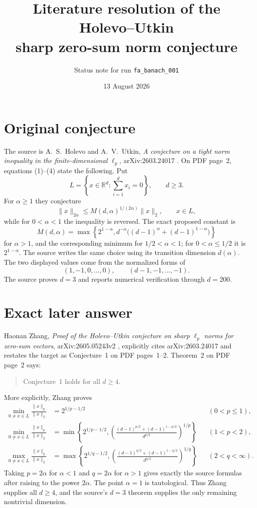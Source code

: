 \documentclass[11pt]{article}
\title{Literature resolution of the Holevo--Utkin\\sharp zero-sum norm conjecture}
\author{Status note for run \texttt{fa\_banach\_001}}
\date{13 August 2026}
\newcommand{\R}{\mathbb R}
\begin{document}
\maketitle

\begin{center}
\end{center}

\section*{Original conjecture}

The source is A.~S.~Holevo and A.~V.~Utkin,
\emph{A conjecture on a tight norm inequality in the finite-dimensional
$\ell_p$}, arXiv:2603.24017 \cite{HU}.  On PDF page~2, equations (1)--(4)
state the following.  Put
\[
 L=\left\{x\in\R^d:\sum_{i=1}^d x_i=0\right\},\qquad d\geq3.
\]
For $\alpha\geq1$ they conjecture
\[
 \|x\|_{2\alpha}\leq M(d,\alpha)^{1/(2\alpha)}\|x\|_2,
 \qquad x\in L,
\]
while for $0<\alpha<1$ the inequality is reversed.  The exact proposed
constant is
\[
 M(d,\alpha)=\max\!\left\{
 2^{1-\alpha},
 d^{-\alpha}\big((d-1)^\alpha+(d-1)^{1-\alpha}\big)
 \right\}
\]
for $\alpha>1$, and the corresponding minimum for $1/2<\alpha<1$;
for $0<\alpha\leq1/2$ it is $2^{1-\alpha}$.  The source writes the same
choice using its transition dimension $d(\alpha)$.  The two displayed values
come from the normalized forms of
\[
 (1,-1,0,\ldots,0),\qquad (d-1,-1,\ldots,-1).
\]
The source proves $d=3$ and reports numerical verification through $d=200$.

\section*{Exact later answer}

Haonan Zhang, \emph{Proof of the Holevo--Utkin conjecture on sharp
$\ell_p$ norms for zero-sum vectors}, arXiv:2605.05243v2 \cite{Z}, explicitly
cites arXiv:2603.24017 and restates the target as Conjecture~1 on PDF
pages~1--2.  Theorem~2 on PDF page~2 says:
\begin{quote}
Conjecture~1 holds for all $d\geq4$.
\end{quote}
More explicitly, Zhang proves
\begin{align*}
 \min_{0\neq x\in L}\frac{\|x\|_p}{\|x\|_2}
 &=2^{1/p-1/2} &&(0<p\leq1),\\
 \min_{0\neq x\in L}\frac{\|x\|_p}{\|x\|_2}
 &=\min\left\{2^{1/p-1/2},
 \left(\frac{(d-1)^{p/2}+(d-1)^{1-p/2}}{d^{p/2}}\right)^{1/p}\right\}
 &&(1<p<2),\\
 \max_{0\neq x\in L}\frac{\|x\|_q}{\|x\|_2}
 &=\max\left\{2^{1/q-1/2},
 \left(\frac{(d-1)^{q/2}+(d-1)^{1-q/2}}{d^{q/2}}\right)^{1/q}\right\}
 &&(2<q<\infty).
\end{align*}
Taking $p=2\alpha$ for $\alpha<1$ and $q=2\alpha$ for $\alpha>1$ gives
exactly the source formulas after raising to the power $2\alpha$.  The point
$\alpha=1$ is tautological.  Thus Zhang supplies all $d\geq4$, and the
source's $d=3$ theorem supplies the only remaining nontrivial dimension.
\end{document}
